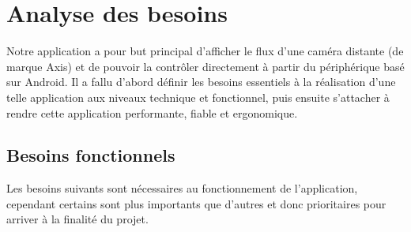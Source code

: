 \chapter{Analyse des besoins}
Notre application a pour but principal d'afficher le flux d'une caméra distante (de marque Axis) et de pouvoir la contrôler directement à partir du périphérique basé sur Android.
Il a fallu d'abord définir les besoins essentiels à la réalisation d'une telle application aux niveaux technique et fonctionnel, puis ensuite s'attacher à rendre cette application
performante, fiable et ergonomique.

\section{Besoins fonctionnels}
Les besoins suivants sont nécessaires au fonctionnement de l'application, cependant certains sont plus importants que d'autres et donc prioritaires pour arriver à la finalité du projet.
